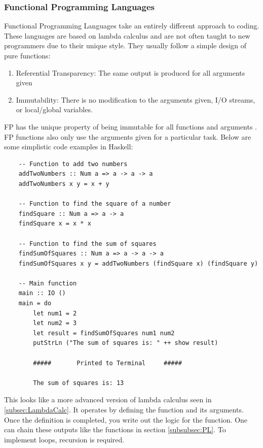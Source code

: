 \subsubsection{Functional Programming Languages}\label{subsubsec:FPL}

Functional Programming Languages take an entirely different approach to coding.
These languages are based on lambda calculus and are not often taught to new programmers due to their unique style.
They usually follow a simple design of pure functions:
\begin{enumerate}
    \item Referential Transparency: The same output is produced for all arguments given
    \item Immutability: There is no modification to the arguments given, I/O streams, or local/global variables.
\end{enumerate}

FP has the unique property of being immutable for all functions and arguments \cite{FP1,FP2,RefTransp1,RefTransp2}.
FP functions also only use the arguments given for a particular task.
Below are some simplistic code examples in Haskell:

\begin{verbatim}
    -- Function to add two numbers
    addTwoNumbers :: Num a => a -> a -> a
    addTwoNumbers x y = x + y
    
    -- Function to find the square of a number
    findSquare :: Num a => a -> a
    findSquare x = x * x
    
    -- Function to find the sum of squares
    findSumOfSquares :: Num a => a -> a -> a
    findSumOfSquares x y = addTwoNumbers (findSquare x) (findSquare y)
    
    -- Main function
    main :: IO ()
    main = do
        let num1 = 2
        let num2 = 3
        let result = findSumOfSquares num1 num2
        putStrLn ("The sum of squares is: " ++ show result) 

        #####       Printed to Terminal     #####

        The sum of squares is: 13

\end{verbatim}

This looks like a more advanced version of lambda calculus seen in \ref{subsec:LambdaCalc}.
It operates by defining the function and its arguments.
Once the definition is completed, you write out the logic for the function.
One can chain these outputs like the functions in section \ref{subsubsec:PL}.
To implement loops, recursion is required.

